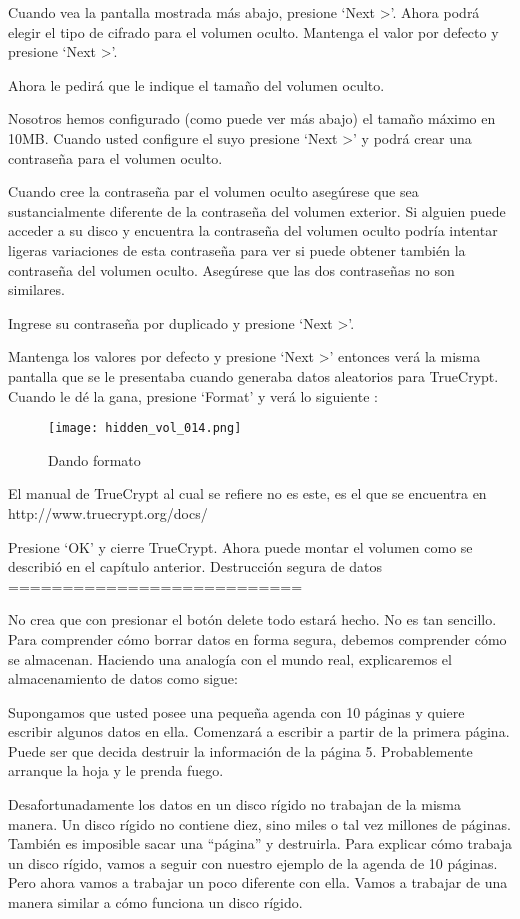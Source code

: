 \documentclass[10pt,a5paper,twoside,,]{book}
\begin{document}
Cuando vea la pantalla mostrada más abajo, presione `Next
\textgreater{}'. Ahora podrá elegir el tipo de cifrado para el volumen
oculto. Mantenga el valor por defecto y presione `Next \textgreater{}'.

Ahora le pedirá que le indique el tamaño del volumen oculto.

Nosotros hemos configurado (como puede ver más abajo) el tamaño máximo
en 10MB. Cuando usted configure el suyo presione `Next \textgreater{}' y
podrá crear una contraseña para el volumen oculto.

Cuando cree la contraseña par el volumen oculto asegúrese que sea
sustancialmente diferente de la contraseña del volumen exterior. Si
alguien puede acceder a su disco y encuentra la contraseña del volumen
oculto podría intentar ligeras variaciones de esta contraseña para ver
si puede obtener también la contraseña del volumen oculto. Asegúrese que
las dos contraseñas no son similares.

Ingrese su contraseña por duplicado y presione `Next \textgreater{}'.

Mantenga los valores por defecto y presione `Next \textgreater{}'
entonces verá la misma pantalla que se le presentaba cuando generaba
datos aleatorios para TrueCrypt. Cuando le dé la gana, presione `Format'
y verá lo siguiente :

\begin{figure}[htbp]
\centering
\texttt{[image: hidden\_vol\_014.png]}
\caption{Dando formato}
\end{figure}

El manual de TrueCrypt al cual se refiere no es este, es el que se
encuentra en http://www.truecrypt.org/docs/

Presione `OK' y cierre TrueCrypt. Ahora puede montar el volumen como se
describió en el capítulo anterior. Destrucción segura de datos
===========================

No crea que con presionar el botón delete todo estará hecho. No es tan
sencillo. Para comprender cómo borrar datos en forma segura, debemos
comprender cómo se almacenan. Haciendo una analogía con el mundo real,
explicaremos el almacenamiento de datos como sigue:

Supongamos que usted posee una pequeña agenda con 10 páginas y quiere
escribir algunos datos en ella. Comenzará a escribir a partir de la
primera página. Puede ser que decida destruir la información de la
página 5. Probablemente arranque la hoja y le prenda fuego.

Desafortunadamente los datos en un disco rígido no trabajan de la misma
manera. Un disco rígido no contiene diez, sino miles o tal vez millones
de páginas. También es imposible sacar una ``página'' y destruirla. Para
explicar cómo trabaja un disco rígido, vamos a seguir con nuestro
ejemplo de la agenda de 10 páginas. Pero ahora vamos a trabajar un poco
diferente con ella. Vamos a trabajar de una manera similar a cómo
funciona un disco rígido.
\end{document}
